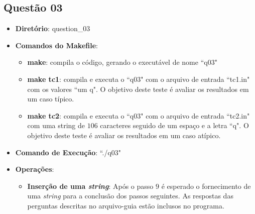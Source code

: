 	\subsection{Questão 03}
			\begin{itemize}
				\item{\textbf{Diretório}: question\_03}
				\item{\textbf{Comandos do Makefile}:
				\begin{itemize}
					\item{\textbf{make}: compila o código, gerando o executável de nome ``q03"}
					\item{\textbf{make tc1}: compila e executa o ``q03" com o arquivo de entrada ``tc1.in" com os valores ``um q". O objetivo deste teste é avaliar os resultados em um caso típico.}
					\item{\textbf{make tc2}: compila e executa o ``q03" com o arquivo de entrada ``tc2.in" com uma string de $106$ caracteres seguido de um espaço e a letra ``q". O objetivo deste teste é avaliar os resultados em um caso atípico.}
				\end{itemize}}
				\item{\textbf{Comando de Execução}: ``./q03"}
				\item{\textbf{Operações}:
				\begin{itemize}
					\item{\textbf{Inserção de uma \emph{string}}: Após o passo $9$ é esperado o fornecimento de uma \emph{string} para a conclusão dos passos seguintes. As respostas das perguntas descritas no arquivo-guia estão inclusos no programa.}
				\end{itemize}}
			\end{itemize}
